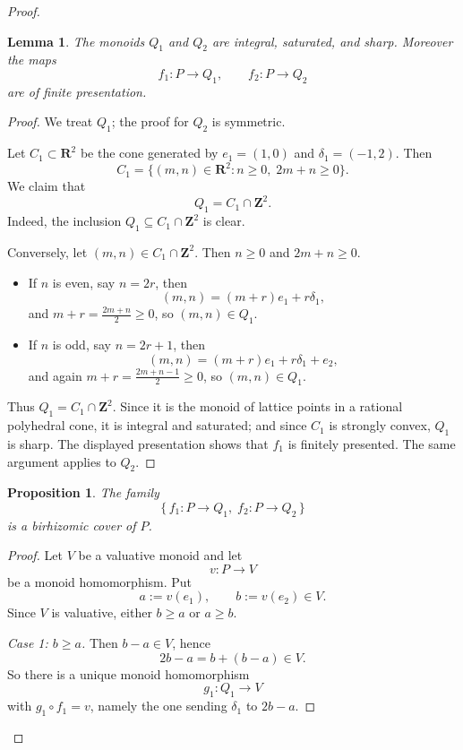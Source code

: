 \documentclass[11pt]{article}
\newtheorem{lemma}[theorem]{Lemma}
\newtheorem{proposition}[theorem]{Proposition}
\begin{document}
\begin{proof}
\begin{lemma}\label{lemma:Qisfs}
The monoids \(Q_1\) and \(Q_2\) are integral, saturated, and sharp. Moreover the maps
\[
f_1\colon P\to Q_1,\qquad f_2\colon P\to Q_2
\]
are of finite presentation.
\end{lemma}

\begin{proof}
We treat \(Q_1\); the proof for \(Q_2\) is symmetric.

Let \(C_1\subset \mathbf R^2\) be the cone generated by \(e_1=(1,0)\) and \(\delta_1=(-1,2)\). Then
\[
C_1=\{(m,n)\in \mathbf R^2 : n\ge 0,\; 2m+n\ge 0\}.
\]
We claim that
\[
Q_1 = C_1\cap \mathbf Z^2.
\]
Indeed, the inclusion \(Q_1\subseteq C_1\cap \mathbf Z^2\) is clear.

Conversely, let \((m,n)\in C_1\cap \mathbf Z^2\). Then \(n\ge 0\) and \(2m+n\ge 0\).

\begin{itemize}
\item If \(n\) is even, say \(n=2r\), then
\[
(m,n)=(m+r)e_1+r\delta_1,
\]
and \(m+r=\frac{2m+n}{2}\ge 0\), so \((m,n)\in Q_1\).

\item If \(n\) is odd, say \(n=2r+1\), then
\[
(m,n)=(m+r)e_1+r\delta_1+e_2,
\]
and again \(m+r=\frac{2m+n-1}{2}\ge 0\), so \((m,n)\in Q_1\).
\end{itemize}

Thus \(Q_1=C_1\cap \mathbf Z^2\). Since it is the monoid of lattice points in a rational polyhedral cone, it is integral and saturated; and since \(C_1\) is strongly convex, \(Q_1\) is sharp. The displayed presentation shows that \(f_1\) is finitely presented. The same argument applies to \(Q_2\).
\end{proof}

\begin{proposition}\label{prop:cover}
The family
\[
\{\,f_1\colon P\to Q_1,\; f_2\colon P\to Q_2\,\}
\]
is a birhizomic cover of \(P\).
\end{proposition}

\begin{proof}
Let \(V\) be a valuative monoid and let
\[
v\colon P\to V
\]
be a monoid homomorphism. Put
\[
a:=v(e_1),\qquad b:=v(e_2)\in V.
\]
Since \(V\) is valuative, either \(b\ge a\) or \(a\ge b\).

\smallskip
\noindent
\emph{Case 1: \(b\ge a\).}
Then \(b-a\in V\), hence
\[
2b-a=b+(b-a)\in V.
\]
So there is a unique monoid homomorphism
\[
g_1\colon Q_1\to V
\]
with \(g_1\circ f_1=v\), namely the one sending \(\delta_1\) to \(2b-a\).


\end{proof}
\end{proof}
\end{document}
